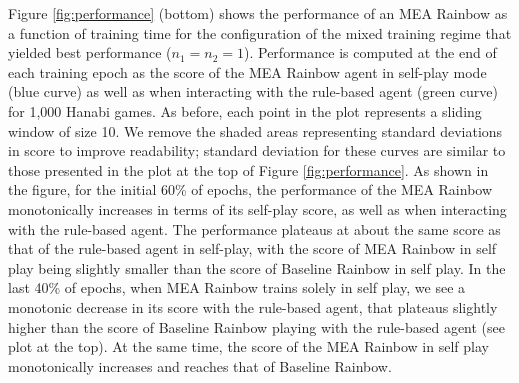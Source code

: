 \documentclass[letterpaper]{article} %
\begin{document}

 
 Figure \ref{fig:performance} (bottom) shows the performance of an MEA Rainbow  as a function of training time for the   configuration of the  mixed training regime that yielded best performance ($n_1=n_2=1$). 
Performance is computed at the end of each training epoch as the score of the MEA Rainbow agent  in self-play mode  (blue curve) as well as  when interacting with the rule-based agent (green curve) for 1,000 Hanabi games.   
As before, each point in the plot represents a  sliding window of size 10. We remove the shaded areas representing standard deviations in score to improve readability; standard deviation for these curves are similar to those presented in the plot at the top of   Figure \ref{fig:performance}. 
As shown in the figure, for the initial 60\% of epochs, the performance of the MEA Rainbow monotonically increases in terms of its self-play score, as well as when interacting with the rule-based agent. 
The performance plateaus at about the same score as that of the rule-based agent in self-play, with 
the score of MEA Rainbow in self play being slightly smaller than the score of Baseline Rainbow in self play. 
In the last 40\% of epochs, when MEA Rainbow trains solely in self play, we see a monotonic decrease in its score with the rule-based agent, that plateaus slightly higher than the score of  Baseline Rainbow playing with the rule-based agent (see plot at the top). At the same time, the score of the  MEA Rainbow in self play monotonically increases and reaches that of Baseline Rainbow.

\end{document}
